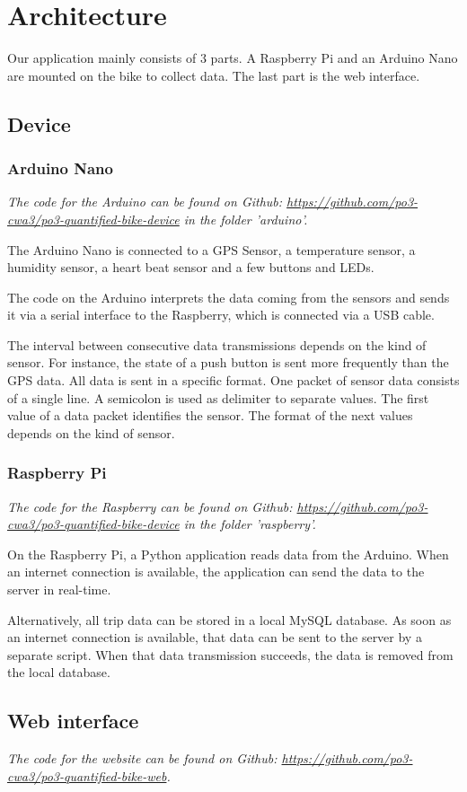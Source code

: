 \section{Architecture}
Our application mainly consists of 3 parts. 
A Raspberry Pi and an Arduino Nano are mounted on the bike to collect data. 
The last part is the web interface.
\subsection{Device}
\subsubsection{Arduino Nano}
\textit{The code for the Arduino can be found on Github: \url{https://github.com/po3-cwa3/po3-quantified-bike-device} in the folder 'arduino'.}

The Arduino Nano is connected to a GPS Sensor, a temperature sensor, a humidity sensor, a heart beat sensor and a few buttons and LEDs. 

The code on the Arduino interprets the data coming from the sensors and sends it via a serial interface to the Raspberry, which is connected via a USB cable.

The interval between consecutive data transmissions depends on the kind of sensor. 
For instance, the state of a push button is sent more frequently than the GPS data.
All data is sent in a specific format. One packet of sensor data consists of a single line.
A semicolon is used as delimiter to separate values. The first value of a data packet identifies the sensor. 
The format of the next values depends on the kind of sensor.
\subsubsection{Raspberry Pi}
\textit{The code for the Raspberry can be found on Github: \url{https://github.com/po3-cwa3/po3-quantified-bike-device} in the folder 'raspberry'.}

On the Raspberry Pi, a Python application reads data from the Arduino. 
When an internet connection is available, the application can send the data to the server in real-time.

Alternatively, all trip data can be stored in a local MySQL database. 
As soon as an internet connection is available, that data can be sent to the server by a separate script.
When that data transmission succeeds, the data is removed from the local database.
\subsection{Web interface}
\textit{The code for the website can be found on Github: \url{https://github.com/po3-cwa3/po3-quantified-bike-web}.}


